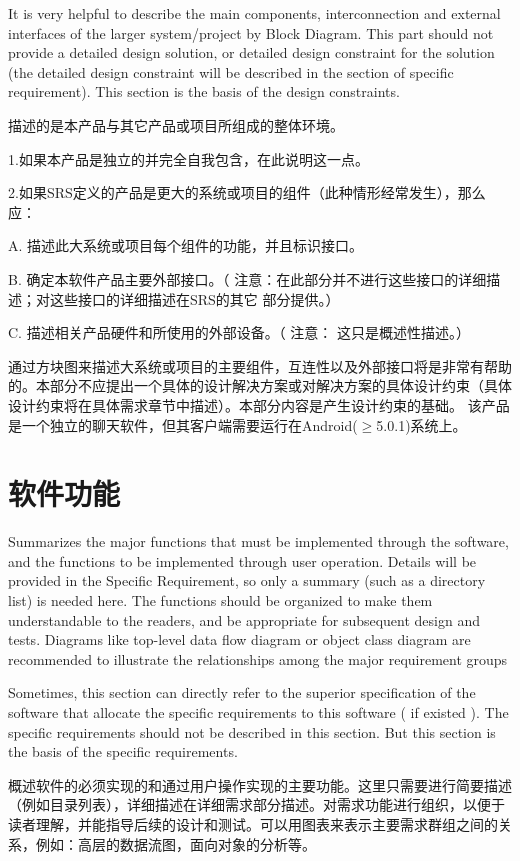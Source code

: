 It is very helpful to describe the main components, interconnection and external interfaces of the larger system/project by Block Diagram. This part should not provide a detailed design solution, or detailed design constraint for the solution (the detailed design constraint will be described in the section of specific requirement). This section is the basis of the design constraints.

描述的是本产品与其它产品或项目所组成的整体环境。

1.如果本产品是独立的并完全自我包含，在此说明这一点。

2.如果SRS定义的产品是更大的系统或项目的组件（此种情形经常发生），那么应：

	A. 描述此大系统或项目每个组件的功能，并且标识接口。

	B.  确定本软件产品主要外部接口。（ 注意：在此部分并不进行这些接口的详细描述；对这些接口的详细描述在SRS的其它 部分提供。）
    
    C. 描述相关产品硬件和所使用的外部设备。（  注意：  这只是概述性描述。）

通过方块图来描述大系统或项目的主要组件，互连性以及外部接口将是非常有帮助的。本部分不应提出一个具体的设计解决方案或对解决方案的具体设计约束（具体设计约束将在具体需求章节中描述）。本部分内容是产生设计约束的基础。
\fi  %
该产品是一个独立的聊天软件，但其客户端需要运行在Android($\ge$5.0.1)系统上。
\section{软件功能}
\iffalse  %
Summarizes the major functions that must be implemented through the software, and the functions to be implemented through user operation. Details will be provided in the Specific Requirement, so only a summary (such as a directory list) is needed here. The functions should be organized to make them understandable to the readers, and be appropriate for subsequent design and tests. Diagrams like top-level data flow diagram or object class diagram are recommended to illustrate the relationships among the major requirement groups 

Sometimes, this section can directly refer to the superior specification of the software that allocate the specific requirements to this software ( if existed ).
The specific requirements should not be described in this section. But this section is the basis of the specific requirements.

概述软件的必须实现的和通过用户操作实现的主要功能。这里只需要进行简要描述（例如目录列表），详细描述在详细需求部分描述。对需求功能进行组织，以便于读者理解，并能指导后续的设计和测试。可以用图表来表示主要需求群组之间的关系，例如：高层的数据流图，面向对象的分析等。

